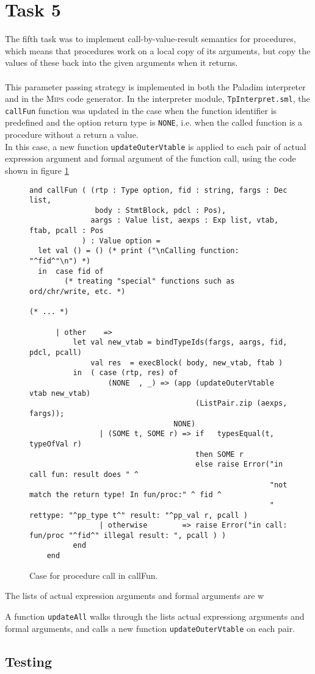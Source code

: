 \section{Task 5}
The fifth task was to implement call-by-value-result semantics for procedures,
which means that procedures work on a local copy of its arguments, but copy the
values of these back into the given arguments when it returns.\\
\\
This parameter passing strategy is implemented in both the \textsf{Paladim}
interpreter and in the \textsc{Mips} code generator. In the interpreter module,
\verb|TpInterpret.sml|, the \verb|callFun| function was updated in the case when
the function identifier is predefined and the  option return type is
\verb|NONE|, i.e. when the called function is a procedure without a return a
value.\\
In this case, a new function \verb|updateOuterVtable| is applied to each pair of
actual expression argument and formal argument of the function call, using the
code shown in figure \ref{fig_callFun}
 
\begin{figure}[H]
  \begin{lstlisting}[style=MLStyle]
and callFun ( (rtp : Type option, fid : string, fargs : Dec list,
               body : StmtBlock, pdcl : Pos),
              aargs : Value list, aexps : Exp list, vtab, ftab, pcall : Pos
            ) : Value option =
  let val () = () (* print ("\nCalling function: "^fid^"\n") *)
  in  case fid of
        (* treating "special" functions such as ord/chr/write, etc. *)

(* ... *)

      | other    =>
          let val new_vtab = bindTypeIds(fargs, aargs, fid, pdcl, pcall)
              val res  = execBlock( body, new_vtab, ftab )
          in  ( case (rtp, res) of
                  (NONE  , _) => (app (updateOuterVtable vtab new_vtab)
                                      (ListPair.zip (aexps, fargs));
                                 NONE)
                | (SOME t, SOME r) => if   typesEqual(t, typeOfVal r) 
                                      then SOME r
                                      else raise Error("in call fun: result does " ^
                                                       "not match the return type! In fun/proc:" ^ fid ^ 
                                                       " rettype: "^pp_type t^" result: "^pp_val r, pcall )
                | otherwise        => raise Error("in call: fun/proc "^fid^" illegal result: ", pcall ) )
          end
    end
  \end{lstlisting}
  \caption{Case for procedure call in callFun.}
  \label{fig_callFun}
\end{figure}
 




The lists of actual expression arguments and formal arguments are w

A function \verb|updateAll| walks through the lists actual expressiong
arguments and formal arguments, and calls a new function
\verb|updateOuterVtable| on each pair.

\subsection{Testing}
